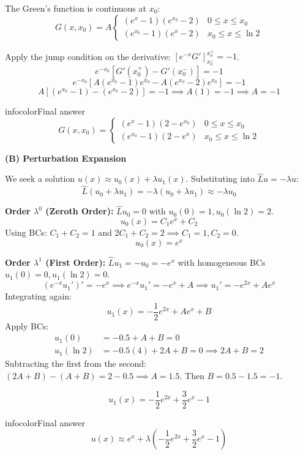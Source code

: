 \documentclass[a4paper,11pt]{article} %
\newenvironment{summarybox}[1][]{\begin{custombox}[#1]{infocolor}{Final answer}}{\end{custombox}}
\begin{document}
The Green's function is continuous at $x_0$:
$$ G(x, x_0) = A \begin{cases} (e^x - 1)(e^{x_0} - 2) & 0 \le x \le x_0 \\ (e^{x_0} - 1)(e^x - 2) & x_0 \le x \le \ln 2 \end{cases} $$

Apply the jump condition on the derivative: $[e^{-x} G']_{x_0^-}^{x_0^+} = -1$.
$$ e^{-x_0} \left[ G'(x_0^+) - G'(x_0^-) \right] = -1 $$
$$ e^{-x_0} \left[ A(e^{x_0}-1)e^{x_0} - A(e^{x_0}-2)e^{x_0} \right] = -1 $$
$$ A [ (e^{x_0}-1) - (e^{x_0}-2) ] = -1 \implies A(1) = -1 \implies A = -1 $$

\begin{summarybox}[title={Part A Answer}]
$$ G(x, x_0) = \begin{cases} (e^x - 1)(2 - e^{x_0}) & 0 \le x \le x_0 \\ (e^{x_0} - 1)(2 - e^x) & x_0 \le x \le \ln 2 \end{cases} $$
\end{summarybox}

\textbf{(B) Perturbation Expansion}

We seek a solution $u(x) \approx u_0(x) + \lambda u_1(x)$.
Substituting into $\hat{L}u = -\lambda u$:
$$ \hat{L}(u_0 + \lambda u_1) = -\lambda(u_0 + \lambda u_1) \approx -\lambda u_0 $$

\textbf{Order $\lambda^0$ (Zeroth Order):}
$\hat{L}u_0 = 0$ with $u_0(0)=1, u_0(\ln 2)=2$.
$$ u_0(x) = C_1 e^x + C_2 $$
Using BCs: $C_1 + C_2 = 1$ and $2C_1 + C_2 = 2 \implies C_1 = 1, C_2 = 0$.
$$ u_0(x) = e^x $$

\textbf{Order $\lambda^1$ (First Order):}
$\hat{L}u_1 = -u_0 = -e^x$ with homogeneous BCs $u_1(0)=0, u_1(\ln 2)=0$.
$$ (e^{-x} u_1')' = -e^x \implies e^{-x} u_1' = -e^x + A \implies u_1' = -e^{2x} + Ae^x $$
Integrating again:
$$ u_1(x) = -\frac{1}{2}e^{2x} + Ae^x + B $$
Apply BCs:
\begin{align*}
    u_1(0) &= -0.5 + A + B = 0 \\
    u_1(\ln 2) &= -0.5(4) + 2A + B = 0 \implies 2A + B = 2
\end{align*}
Subtracting the first from the second: $(2A+B) - (A+B) = 2 - 0.5 \implies A = 1.5$.
Then $B = 0.5 - 1.5 = -1$.

$$ u_1(x) = -\frac{1}{2}e^{2x} + \frac{3}{2}e^x - 1 $$

\begin{summarybox}[title={Part B Answer}]
$$ u(x) \approx e^x + \lambda \left( -\frac{1}{2}e^{2x} + \frac{3}{2}e^x - 1 \right) $$
\end{summarybox}
\end{document}
